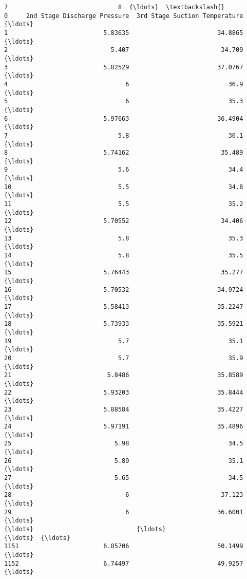 \documentclass[11pt]{article}
\begin{document}
\begin{tcolorbox}[breakable, size=fbox, boxrule=.5pt, pad at break*=1mm, opacityfill=0]
\begin{Verbatim}[commandchars=\\\{\}]
                                 7                              8  {\ldots}  \textbackslash{}
0     2nd Stage Discharge Pressure  3rd Stage Suction Temperature  {\ldots}
1                          5.83635                        34.8865  {\ldots}
2                            5.407                         34.709  {\ldots}
3                          5.82529                        37.0767  {\ldots}
4                                6                           36.9  {\ldots}
5                                6                           35.3  {\ldots}
6                          5.97663                        36.4904  {\ldots}
7                              5.8                           36.1  {\ldots}
8                          5.74162                         35.489  {\ldots}
9                              5.6                           34.4  {\ldots}
10                             5.5                           34.8  {\ldots}
11                             5.5                           35.2  {\ldots}
12                         5.70552                         34.406  {\ldots}
13                             5.8                           35.3  {\ldots}
14                             5.8                           35.5  {\ldots}
15                         5.76443                         35.277  {\ldots}
16                         5.70532                        34.9724  {\ldots}
17                         5.58413                        35.2247  {\ldots}
18                         5.73933                        35.5921  {\ldots}
19                             5.7                           35.1  {\ldots}
20                             5.7                           35.9  {\ldots}
21                          5.8486                        35.8589  {\ldots}
22                         5.93203                        35.8444  {\ldots}
23                         5.88584                        35.4227  {\ldots}
24                         5.97191                        35.4896  {\ldots}
25                            5.98                           34.5  {\ldots}
26                            5.89                           35.1  {\ldots}
27                            5.65                           34.5  {\ldots}
28                               6                         37.123  {\ldots}
29                               6                        36.6001  {\ldots}
{\ldots}                            {\ldots}                            {\ldots}  {\ldots}
1151                       6.85706                        50.1499  {\ldots}
1152                       6.74497                        49.9257  {\ldots}

\end{Verbatim}
\end{tcolorbox}
\end{document}
